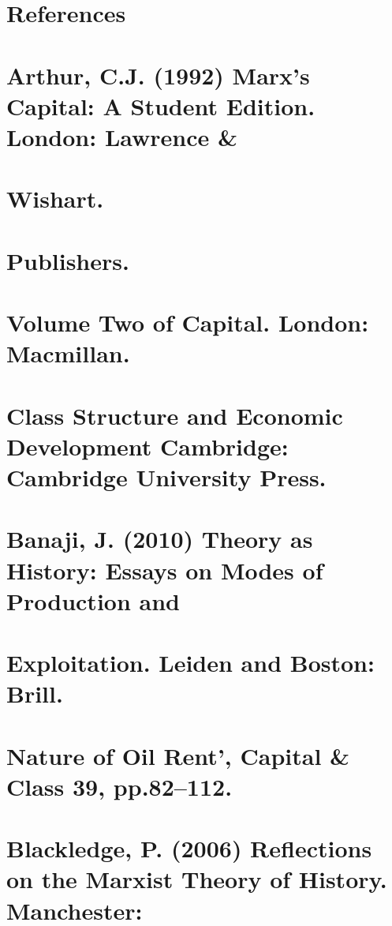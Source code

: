 


\section{References}


\section{Arthur, C.J. (1992) Marx’s Capital: A Student Edition. London: Lawrence &}


\section{Wishart.}


\section{Publishers.}


\section{Volume Two of Capital. London: Macmillan.}


\section{Class Structure and Economic Development Cambridge: Cambridge University Press.}


\section{Banaji, J. (2010) Theory as History: Essays on Modes of Production and}


\section{Exploitation. Leiden and Boston: Brill.}


\section{Nature of Oil Rent’, Capital & Class 39, pp.82–112.}


\section{Blackledge, P. (2006) Reflections on the Marxist Theory of History. Manchester:}


